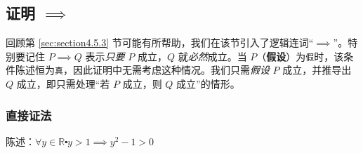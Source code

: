 
\subsection{证明 $\implies$}\label{sec:section4.9.5}

回顾第 \ref{sec:section4.5.3} 节可能有所帮助，我们在该节引入了逻辑连词``$\implies$''。特别要记住 $P \implies Q$ 表示\emph{只要} $P$ 成立，$Q$ 就\emph{必然}成立。当 $P$（\textbf{假设}）为\verb|假|时，该条件陈述恒为\verb|真|，因此证明中无需考虑这种情况。我们只需\emph{假设} $P$ 成立，并推导出 $Q$ 成立，即只需处理``若 $P$ 成立，则 $Q$ 成立''的情形。

\subsubsection*{直接证法}

\begin{center}
    \noindent {}
\end{center}

\begin{example}[平方的单调性]
    \begin{center}
        陈述：$\forall y \in \mathbb{R} \centerdot y>1 \implies y^2-1>0$
    \end{center}
    
    \begin{center}
        \noindent {}
    \end{center}
\end{example}

